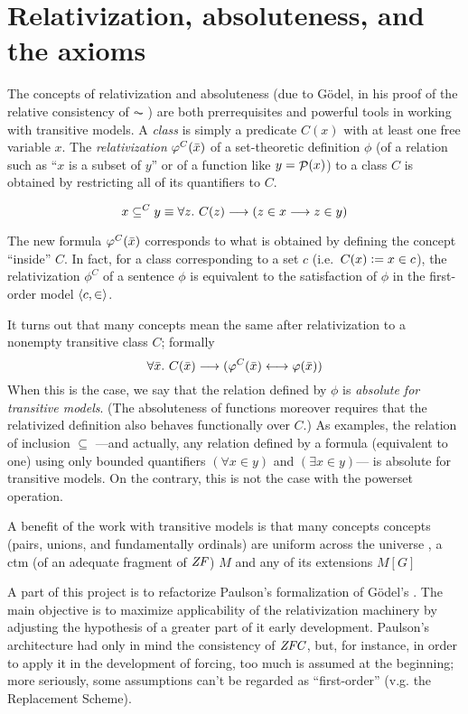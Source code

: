 \section{Relativization,  absoluteness, and the axioms}
\label{sec:relat-absol}

The concepts of relativization and absoluteness (due to Gödel, in his
proof of the relative consistency of $\AC$ \cite{godel-L}) 
are both
prerrequisites and powerful tools in working with transitive
models. A \emph{class} is simply a predicate $C(x)$ with at least one
free variable $x$.
The \emph{relativization} $\phi^C(\bx)$ of a set-theoretic
definition
$\phi$ (of a relation such
as ``$x$ is a subset of $y$'' or of a function like $y=\P(x)$) to
a class $C$ is obtained by restricting all of its quantifiers to $C$.

\[
x \sbq^C y \equiv \forall z.\ C(z) \longrightarrow (z\in x
\longrightarrow z\in y)
\]

The new formula $\phi^C(\bx)$ corresponds to what is obtained by defining
the concept ``inside'' $C$. In fact, for a class corresponding to a
set $c$ (i.e.\ $C(x) \defi x \in c$), the relativization $\phi^C$ of a 
sentence $\phi$ is equivalent to the satisfaction of $\phi$ in the
first-order model $\lb c, \in\rb$.

It turns out that many concepts mean the
same after relativization to a nonempty transitive class $C$; formally
\[
\forall\bx.\ C(\bx) \longrightarrow (\phi^C(\bx) \longleftrightarrow
\phi(\bx))
\]
When this is the case, we say that the relation defined by $\phi$ is
\emph{absolute for transitive models}. (The absoluteness of functions
moreover requires that
the relativized definition also behaves functionally over $C$.) As
examples, the relation of inclusion $\subseteq$ ---and actually, any
relation defined by a formula (equivalent to one) using only bounded
quantifiers 
$(\forall x\in y)$ and $(\exists x\in y)$--- is absolute for
transitive models. On the contrary, this is not the case with the powerset
operation.

A benefit of the work with transitive models is that many 
concepts concepts (pairs, unions, and fundamentally ordinals) are
uniform across the universe , a ctm (of an adequate fragment of
$\ZF$) $M$ and any of its extensions $M[G]$

A part of this project is to refactorize Paulson's formalization
\cite{paulson_2003} of Gödel's \cite{godel-L}. The main objective is
to maximize applicability of the relativization machinery by adjusting
the hypothesis of a greater part of it early development. Paulson's
architecture had only in mind the consistency of $\ZFC$, but, for
instance, in order to apply it in the development of forcing, too much
is assumed at the beginning; more seriously, some assumptions can't be
regarded as ``first-order'' (v.g. the Replacement Scheme).

